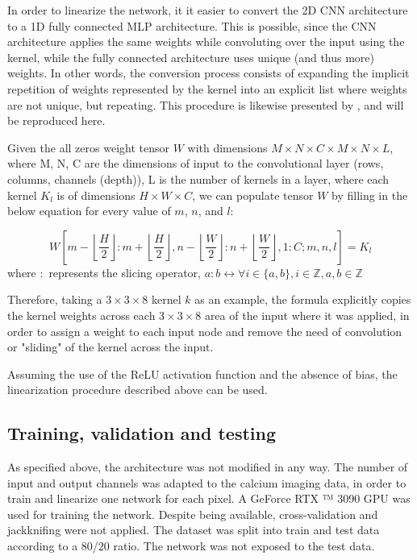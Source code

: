In order to linearize the network, it it easier to convert the 2D CNN architecture to a 1D fully connected MLP architecture. This is possible, since the CNN architecture applies the same weights while convoluting over the input using the kernel, while the fully connected architecture uses unique (and thus more) weights. In other words, the conversion process consists of expanding the implicit repetition of weights represented by the kernel into an explicit list where weights are not unique, but repeating. This procedure is likewise presented by \textcite{keshishianEstimatingInterpretingNonlinear2020}, and will be reproduced here.

Given the all zeros weight tensor $W$ with dimensions $M \times N \times C \times M \times N \times L$, where M, N, C are the dimensions of input to the convolutional layer (rows, columns, channels (depth)), L is the number of kernels in a layer, where each kernel $K_l$ is of dimensions $H \times W \times C$, we can populate tensor $W$ by filling in the below equation for every value of $m$, $n$, and $l$:

\begin{equation}
	W\left[m - \left\lfloor\frac{H}{2}\right\rfloor:m+ \left\lfloor\frac{H}{2}\right\rfloor, n- \left\lfloor\frac{W}{2}\right\rfloor:n+ \left\lfloor\frac{W}{2}\right\rfloor, 1:C; m, n, l\right] = K_l
\end{equation} 
\noindent where $:$ represents the slicing operator, $a:b \leftrightarrow \forall i \in \{a, b\}, i \in \mathbb{Z}, a, b \in \mathbb{Z}$

Therefore, taking a $3 \times 3 \times 8$ kernel $k$ as an example, the formula explicitly copies the kernel weights across each $3 \times 3 \times 8$ area of the input where it was applied, in order to assign a weight to each input node and remove the need of convolution or "sliding" of the kernel across the input.

Assuming the use of the ReLU activation function and the absence of bias, the linearization procedure described above can be used.


\subsection{Training, validation and testing}
As specified above, the architecture was not modified in any way. The number of input and output channels was adapted to the calcium imaging data, in order to train and linearize one network for each pixel. A  GeForce RTX ™ 3090 GPU was used for training the network. Despite being available, cross-validation and jackknifing were not applied. The dataset was split into train and test data according to a 80/20 ratio. The network was not exposed to the test data.

